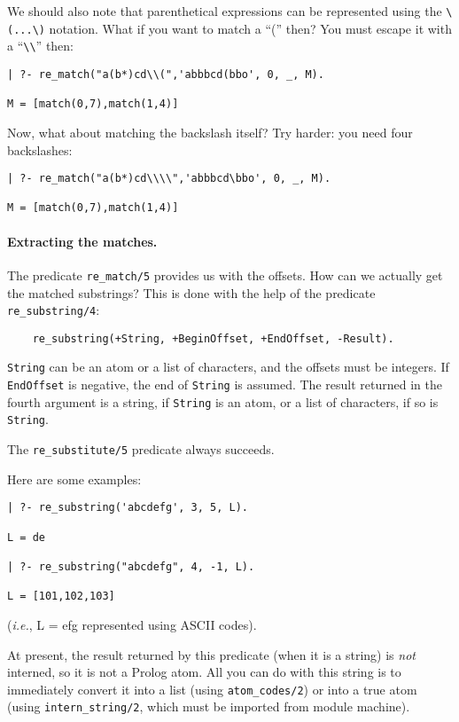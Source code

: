 We should also note that parenthetical expressions can be represented
using the \verb|\(...\)| notation. What if you want to match a ``('' then?
You must escape it with a ``\verb|\\|'' then:
\begin{verbatim}
| ?- re_match("a(b*)cd\\(",'abbbcd(bbo', 0, _, M).

M = [match(0,7),match(1,4)]
\end{verbatim}
Now, what about matching the backslash itself? Try harder: you need four
backslashes: 
\begin{verbatim}
| ?- re_match("a(b*)cd\\\\",'abbbcd\bbo', 0, _, M).

M = [match(0,7),match(1,4)]
\end{verbatim}

\paragraph{Extracting the matches.}
The predicate \verb|re_match/5| provides us with the offsets. How can we
actually get the matched substrings? This is done with the help of the
predicate \verb|re_substring/4|:
\begin{verbatim}
    re_substring(+String, +BeginOffset, +EndOffset, -Result).
\end{verbatim}
{\tt String} can be an atom or a list of characters, and the offsets must
be integers.  If {\tt EndOffset} is negative, the end of {\tt String} is
assumed.  The result returned in the fourth
argument is a string, if {\tt String} is an atom, or a list of characters,
if so is {\tt String}.

The \verb|re_substitute/5| predicate always succeeds.

Here are some examples: 
\begin{verbatim}
| ?- re_substring('abcdefg', 3, 5, L).

L = de

| ?- re_substring("abcdefg", 4, -1, L).

L = [101,102,103]
\end{verbatim}
({\it i.e.}, L = efg represented using ASCII codes).

At present, the result returned by this predicate (when it is a string) is
\emph{not} interned, so it is not a Prolog atom.  All you can do with this
string is to immediately convert it into a list (using {\tt atom\_codes/2})
or into a true atom (using {\tt intern\_string/2}, which must be imported
from module machine).

